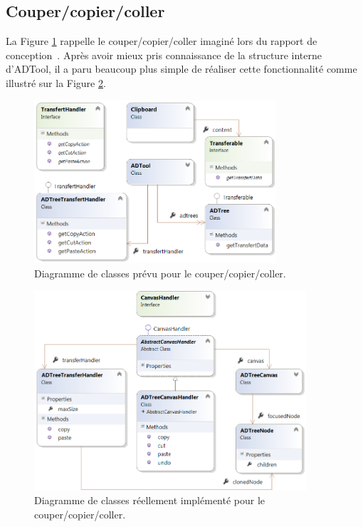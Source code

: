 	\subsection{Couper/copier/coller}

	La {\sc Figure} \ref{fig:copypastePrevu} rappelle le  couper/copier/coller imaginé lors du rapport de conception~\cite{conception}. Après avoir mieux pris connaissance de la structure interne d'ADTool, il a paru beaucoup plus simple de réaliser cette fonctionnalité comme illustré sur la {\sc Figure} \ref{fig:copypasteReel}.
	
	
		\begin{figure}[H]
            \centering
                \includegraphics[width=0.8\textwidth]{figure/copiercoller.png}
            \caption{Diagramme de classes prévu pour le couper/copier/coller.}
            \label{fig:copypastePrevu}
        \end{figure}
        
        \begin{figure}[H]
            \centering
                \includegraphics[width=0.9\textwidth]{figure/copiercollerReel.png}
            \caption{Diagramme de classes réellement implémenté pour le couper/copier/coller.}
            \label{fig:copypasteReel}
        \end{figure}

